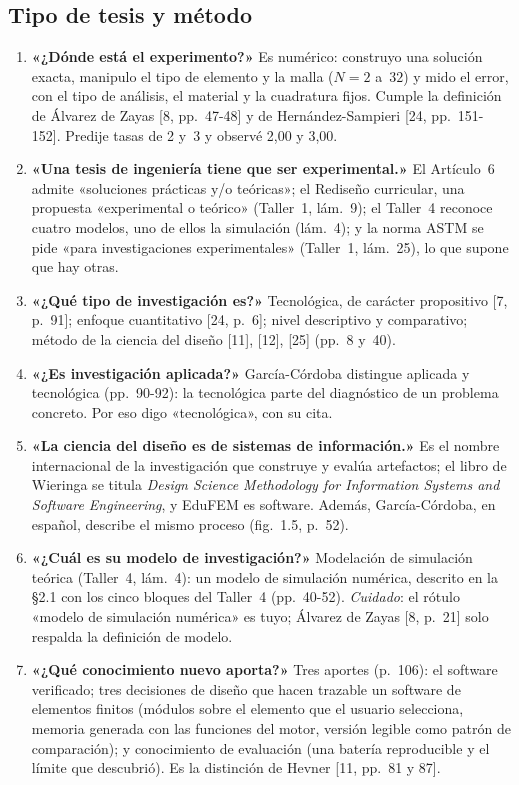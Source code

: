 \documentclass[11pt,a4paper]{article}
\begin{document}
\subsection{Tipo de tesis y método}
\begin{enumerate}[label=\textbf{P\arabic*.},leftmargin=2.2em,series=preg]
\item \textbf{«¿Dónde está el experimento?»} Es numérico: construyo una solución exacta, manipulo el tipo de elemento y la malla ($N=2$ a~$32$) y mido el error, con el tipo de análisis, el material y la cuadratura fijos. Cumple la definición de Álvarez de Zayas [8, pp.~47-48] y de Hernández-Sampieri [24, pp.~151-152]. Predije tasas de 2 y~3 y observé 2,00 y 3,00.
\item \textbf{«Una tesis de ingeniería tiene que ser experimental.»} El Artículo~6 admite «soluciones prácticas y/o teóricas»; el Rediseño curricular, una propuesta «experimental o teórico» (Taller~1, lám.~9); el Taller~4 reconoce cuatro modelos, uno de ellos la simulación (lám.~4); y la norma ASTM se pide «para investigaciones experimentales» (Taller~1, lám.~25), lo que supone que hay otras.
\item \textbf{«¿Qué tipo de investigación es?»} Tecnológica, de carácter propositivo [7, p.~91]; enfoque cuantitativo [24, p.~6]; nivel descriptivo y comparativo; método de la ciencia del diseño [11], [12], [25] (pp.~8 y~40).
\item \textbf{«¿Es investigación aplicada?»} García-Córdoba distingue aplicada y tecnológica (pp.~90-92): la tecnológica parte del diagnóstico de un problema concreto. Por eso digo «tecnológica», con su cita.
\item \textbf{«La ciencia del diseño es de sistemas de información.»} Es el nombre internacional de la investigación que construye y evalúa artefactos; el libro de Wieringa se titula \emph{Design Science Methodology for Information Systems and Software Engineering}, y EduFEM es software. Además, García-Córdoba, en español, describe el mismo proceso (fig.~1.5, p.~52).
\item \textbf{«¿Cuál es su modelo de investigación?»} Modelación de simulación teórica (Taller~4, lám.~4): un modelo de simulación numérica, descrito en la §2.1 con los cinco bloques del Taller~4 (pp.~40-52). \emph{Cuidado}: el rótulo «modelo de simulación numérica» es tuyo; Álvarez de Zayas [8, p.~21] solo respalda la definición de modelo.
\item \textbf{«¿Qué conocimiento nuevo aporta?»} Tres aportes (p.~106): el software verificado; tres decisiones de diseño que hacen trazable un software de elementos finitos (módulos sobre el elemento que el usuario selecciona, memoria generada con las funciones del motor, versión legible como patrón de comparación); y conocimiento de evaluación (una batería reproducible y el límite que descubrió). Es la distinción de Hevner [11, pp.~81 y 87].
\end{enumerate}
\end{document}
